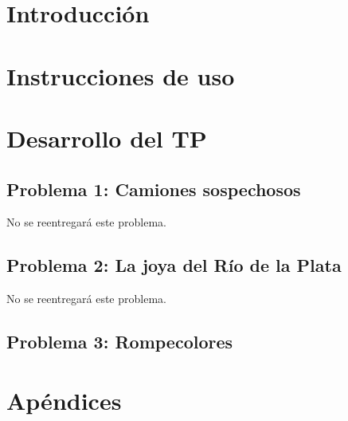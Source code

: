 \documentclass[11pt, a4paper, twoside]{article}
\begin{document}
{}
\newpage{\pagestyle{empty}\cleardoublepage}
\setcounter{page}{1}

\newpage{\pagestyle{empty}\tableofcontents\cleardoublepage}

\begin{TP1}
\section{Introducción}\label{sec:introduccion}

\newpage
\section{Instrucciones de uso}\label{sec:instrucciones}

\newpage

\section{Desarrollo del TP}\label{sec:desarrollo}
	
	\subsection{Problema 1: Camiones sospechosos}\label{subsec:problema1}
  No se reentregará este problema.
	\newpage
	
	\subsection{Problema 2: La joya del Río de la Plata}\label{subsec:problema2}
  No se reentregará este problema.
	\newpage
	
	\subsection{Problema 3: Rompecolores}
	\label{subsec:problema3}
	\clearpage

\section{Apéndices}
	

\end{TP1}
\end{document}
